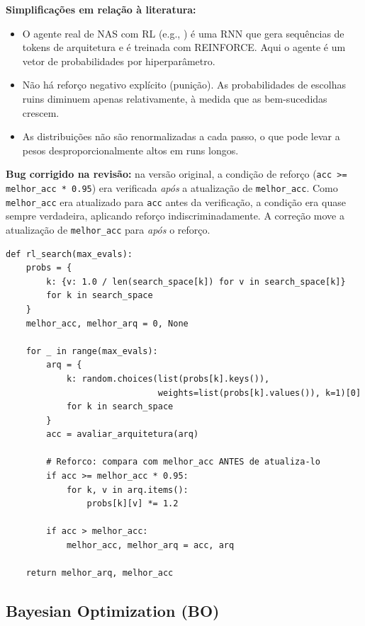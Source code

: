 \documentclass[a4paper,12pt]{article}
\begin{document}
\textbf{Simplificações em relação à literatura:}
\begin{itemize}[noitemsep]
    \item O agente real de NAS com RL (e.g., \cite{zoph2017}) é uma RNN que gera sequências de tokens de arquitetura e é treinada com REINFORCE. Aqui o agente é um vetor de probabilidades por hiperparâmetro.
    \item Não há reforço negativo explícito (punição). As probabilidades de escolhas ruins diminuem apenas relativamente, à medida que as bem-sucedidas crescem.
    \item As distribuições não são renormalizadas a cada passo, o que pode levar a pesos desproporcionalmente altos em runs longos.
\end{itemize}

\textbf{Bug corrigido na revisão:} na versão original, a condição de reforço (\texttt{acc >= melhor\_acc * 0.95}) era verificada \emph{após} a atualização de \texttt{melhor\_acc}. Como \texttt{melhor\_acc} era atualizado para \texttt{acc} antes da verificação, a condição era quase sempre verdadeira, aplicando reforço indiscriminadamente. A correção move a atualização de \texttt{melhor\_acc} para \emph{após} o reforço.

\begin{lstlisting}[style=python, caption={RL como Multi-Armed Bandit por hiperparâmetro.}]
def rl_search(max_evals):
    probs = {
        k: {v: 1.0 / len(search_space[k]) for v in search_space[k]}
        for k in search_space
    }
    melhor_acc, melhor_arq = 0, None

    for _ in range(max_evals):
        arq = {
            k: random.choices(list(probs[k].keys()),
                              weights=list(probs[k].values()), k=1)[0]
            for k in search_space
        }
        acc = avaliar_arquitetura(arq)

        # Reforco: compara com melhor_acc ANTES de atualiza-lo
        if acc >= melhor_acc * 0.95:
            for k, v in arq.items():
                probs[k][v] *= 1.2

        if acc > melhor_acc:
            melhor_acc, melhor_arq = acc, arq

    return melhor_arq, melhor_acc
\end{lstlisting}

\subsection{Bayesian Optimization (BO)}
\end{document}
